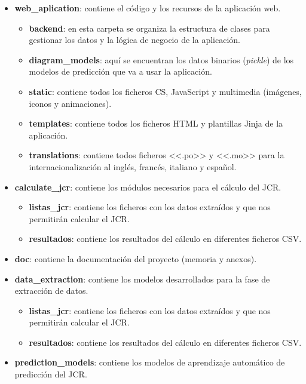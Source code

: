 \begin{itemize}
    \item \textbf{web\_aplication}: contiene el código y los recursos de la aplicación web.
    \begin{itemize}
        \item \textbf{backend}: en esta carpeta se organiza la estructura de clases para gestionar los datos y la lógica de negocio de la aplicación.
        \item \textbf{diagram\_models}: aquí se encuentran los datos binarios (\textit{pickle}) de los modelos de predicción que va a usar la aplicación.
        \item \textbf{static}: contiene todos los ficheros CS, JavaScript y multimedia (imágenes, iconos y animaciones).
        \item \textbf{templates}: contiene todos los ficheros HTML y plantillas Jinja de la aplicación.
        \item \textbf{translations}: contiene todos ficheros <<.po>> y <<.mo>> para la internacionalización al inglés, francés, italiano y español.
        
    \end{itemize}
        
    \item \textbf{calculate\_jcr}: contiene los módulos necesarios para el cálculo del JCR.
    \begin{itemize}
        \item \textbf{listas\_jcr}: contiene los ficheros con los datos extraídos y que nos permitirán calcular el JCR.
        \item \textbf{resultados}: contiene los resultados del cálculo en diferentes ficheros CSV.    
    \end{itemize}
    
    \item \textbf{doc}: contiene la documentación del proyecto (memoria y anexos).
        
    \item \textbf{data\_extraction}: contiene los modelos desarrollados para la fase de extracción de datos.
    \begin{itemize}
        \item \textbf{listas\_jcr}: contiene los ficheros con los datos extraídos y que nos permitirán calcular el JCR.
        \item \textbf{resultados}: contiene los resultados del cálculo en diferentes ficheros CSV.    
    \end{itemize}

    \item \textbf{prediction\_models}: contiene los modelos de aprendizaje automático de predicción del JCR.
\end{itemize}

